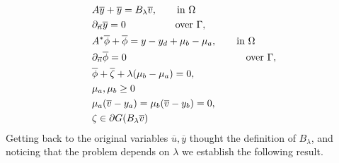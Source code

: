 \documentclass[11pt,a4paper]{amsart}
\begin{document}
\begin{align*}
&A\overline{y}+\overline{y}=B_{\lambda}\overline{v}, \qquad \mbox{in }\Omega\\
&\partial_{\vec{n}}\overline{y}=0\qquad\qquad\quad \mbox{over }\Gamma,\\
&A^*\overline{\phi}+\overline{\phi}=y-y_d+\mu_b-\mu_a, \qquad \mbox{in }\Omega\\
&\partial_{\vec{n}}\overline{\phi}=0\hspace{4.25cm}\mbox{over }\Gamma,\\
&\overline{\phi}+\overline{\zeta}+\lambda(\mu_b-\mu_a)=0,\\
&\mu_a, \mu_b\ge 0\\
&\mu_a(\overline{v}-y_a)=\mu_b(\overline{v}-y_b)=0,\\
&\zeta\in \partial G(B_{\lambda}\overline{v})
\end{align*}
Getting back to the original variables $\overline{u}, \overline{y}$ thought the definition of $B_{\lambda}$, and noticing that the problem depends on $\lambda$ we establish the following result.  
\end{document}
